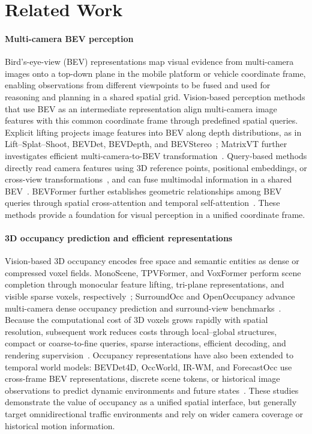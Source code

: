 \documentclass[a4paper,fleqn]{cas-sc}
\begin{document}
\section{Related Work}\label{sec:related}
\paragraph{Multi-camera BEV perception}
Bird's-eye-view (BEV) representations map visual evidence from multi-camera images onto a top-down plane in the mobile platform or vehicle coordinate frame, enabling observations from different viewpoints to be fused and used for reasoning and planning in a shared spatial grid.
Vision-based perception methods that use BEV as an intermediate representation align multi-camera image features with this common coordinate frame through predefined spatial queries.
Explicit lifting projects image features into BEV along depth distributions, as in Lift--Splat--Shoot, BEVDet, BEVDepth, and BEVStereo~\citep{philion2020lift,huang2021bevdet,li2022bevdepth,li2022bevstereo}; MatrixVT further investigates efficient multi-camera-to-BEV transformation~\citep{zhou2022matrixvt}.
Query-based methods directly read camera features using 3D reference points, positional embeddings, or cross-view transformations~\citep{wang2022detr3d,li2022petr,liu2023petrv2,li2023fbbev}, and can fuse multimodal information in a shared BEV~\citep{liu2023bevfusion}.
BEVFormer further establishes geometric relationships among BEV queries through spatial cross-attention and temporal self-attention~\citep{li2022bevformer}. These methods provide a foundation for visual perception in a unified coordinate frame.

\paragraph{3D occupancy prediction and efficient representations}
Vision-based 3D occupancy encodes free space and semantic entities as dense or compressed voxel fields. MonoScene, TPVFormer, and VoxFormer perform scene completion through monocular feature lifting, tri-plane representations, and visible sparse voxels, respectively~\citep{cao2022monoscene,huang2023tpvformer,li2023voxformer}; SurroundOcc and OpenOccupancy advance multi-camera dense occupancy prediction and surround-view benchmarks~\citep{wei2023surroundocc,wang2023openoccupancy}.
Because the computational cost of 3D voxels grows rapidly with spatial resolution, subsequent work reduces costs through local--global structures, compact or coarse-to-fine queries, sparse interactions, efficient decoding, and rendering supervision~\citep{zhang2023occformer,ma2024cotr,wang2024panoocc,liu2024sparseocc,tang2024sparseocc,yu2023flashocc,pan2024renderocc}.
Occupancy representations have also been extended to temporal world models: BEVDet4D, OccWorld, IR-WM, and ForecastOcc use cross-frame BEV representations, discrete scene tokens, or historical image observations to predict dynamic environments and future states~\citep{huang2022bevdet4d,zheng2024occworld,mei2025irwm,mohan2026forecastocc}.
These studies demonstrate the value of occupancy as a unified spatial interface, but generally target omnidirectional traffic environments and rely on wider camera coverage or historical motion information.
\end{document}
